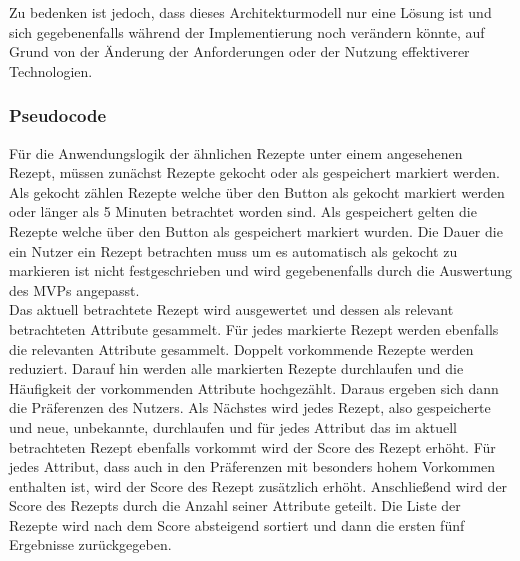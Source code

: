 Zu bedenken ist jedoch, dass dieses Architekturmodell nur eine Lösung ist und sich gegebenenfalls während der Implementierung noch verändern könnte, auf Grund von der Änderung der Anforderungen oder der Nutzung effektiverer Technologien.
\subsubsection{Pseudocode}
Für die Anwendungslogik der ähnlichen Rezepte unter einem angesehenen Rezept, müssen zunächst Rezepte gekocht oder als gespeichert markiert werden. Als gekocht zählen Rezepte welche über den Button als gekocht markiert werden oder länger als 5 Minuten betrachtet worden sind. Als gespeichert gelten die Rezepte welche über den Button als gespeichert markiert wurden. Die Dauer die ein Nutzer ein Rezept betrachten muss um es automatisch als gekocht zu markieren ist nicht festgeschrieben und wird gegebenenfalls durch die Auswertung des MVPs angepasst. \\
Das aktuell betrachtete Rezept wird ausgewertet und dessen als relevant betrachteten Attribute gesammelt. Für jedes markierte Rezept werden ebenfalls die relevanten Attribute gesammelt. Doppelt vorkommende Rezepte werden reduziert. Darauf hin werden alle markierten Rezepte durchlaufen und die Häufigkeit der vorkommenden Attribute hochgezählt. Daraus ergeben sich dann die Präferenzen des Nutzers. Als Nächstes wird jedes Rezept, also gespeicherte und neue, unbekannte, durchlaufen und für jedes Attribut das im aktuell betrachteten Rezept ebenfalls vorkommt wird der Score des Rezept erhöht. Für jedes Attribut, dass auch in den Präferenzen mit besonders hohem Vorkommen enthalten ist, wird der Score des Rezept zusätzlich erhöht. Anschließend wird der Score des Rezepts durch die Anzahl seiner Attribute geteilt. Die Liste der Rezepte wird nach dem Score absteigend sortiert und dann die ersten fünf Ergebnisse zurückgegeben. \\
